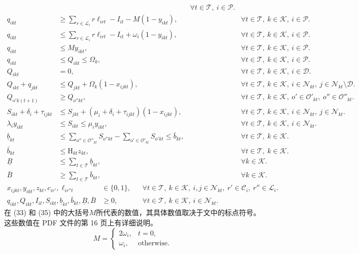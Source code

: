 \documentclass[10pt]{article}
\begin{document}
\begin{align}
&&\forall t\in\mathcal T,\ i\in\mathcal P.\tag{32}\\
 q_{ikt}&\geqslant\sum_{r\in\mathcal L_i}r\ell_{irt}-I_{it}-M(1-y_{ikt}),
&&\forall t\in\mathcal T,\ k\in\mathcal K,\ i\in\mathcal P.\tag{33}\\
 q_{ikt}&\leqslant\sum_{r\in\mathcal L_i}r\ell_{irt}-I_{it}+\omega_i(1-y_{ikt}),
&&\forall t\in\mathcal T,\ k\in\mathcal K,\ i\in\mathcal P.\tag{34}\\
 q_{ikt}&\leqslant My_{ikt},
&&\forall t\in\mathcal T,\ k\in\mathcal K,\ i\in\mathcal P.\tag{35}\\
 q_{ikt}&\leqslant Q_{ikt}\leqslant\Omega_k,
&&\forall t\in\mathcal T,\ k\in\mathcal K,\ i\in\mathcal P.\tag{36}\\
 Q_{ikt}&=0,
&&\forall t\in\mathcal T,\ k\in\mathcal K,\ i\in\mathcal D.\tag{37}\\
 Q_{ikt}+q_{jkt}&\leqslant Q_{jkt}+\Omega_k(1-x_{ijkt}),
&&\forall t\in\mathcal T,\ k\in\mathcal K,\ i\in\mathcal N_{kt},\ j\in\mathcal N_{kt}\setminus\mathcal D.\tag{38}\\
 Q_{o'k(t+1)}&\geqslant Q_{o''kt},
&&\forall t\in\mathcal T,\ k\in\mathcal K,\ o'\in\mathcal O'_{kt},\ o''\in\mathcal O''_{kt}.\tag{39}\\
 S_{ikt}+\delta_i+\tau_{ijkt}
&\leqslant S_{jkt}+(\mu_i+\delta_i+\tau_{ijkt})(1-x_{ijkt}),
&&\forall t\in\mathcal T,\ k\in\mathcal K,\ i\in\mathcal N_{kt},\ j\in\mathcal N_{kt}.\tag{40}\\
\lambda_i y_{ikt}&\leqslant S_{ikt}\leqslant\mu_i y_{ikt},
&&\forall t\in\mathcal T,\ k\in\mathcal K,\ i\in\mathcal N_{kt}.\tag{41}\\
\underline b_{kt}&\leqslant\sum_{o''\in\mathcal O''_{kt}}S_{o''kt}
-\sum_{o'\in\mathcal O'_{kt}}S_{o'kt}\leqslant\bar b_{kt},
&&\forall t\in\mathcal T,\ k\in\mathcal K.\tag{42}\\
\bar b_{kt}&\leqslant\mathrm H_{kt}z_{kt},
&&\forall t\in\mathcal T,\ k\in\mathcal K.\tag{43}\\
\underline B&\leqslant\sum_{t\in\mathcal T}\underline b_{kt},
&&\forall k\in\mathcal K.\tag{44}\\
\bar B&\geqslant\sum_{t\in\mathcal T}\bar b_{kt},
&&\forall k\in\mathcal K.\tag{45}
\end{align}
\begin{align}
 x_{ijkt},y_{ikt},z_{kt},c_{ir'},\ell_{ir''t}&\in\{0,1\},
&&\forall t\in\mathcal T,\ k\in\mathcal K,\ i,j\in\mathcal N_{kt},\ r'\in\mathcal C_i,\ r''\in\mathcal L_i.\tag{46}\\
 q_{ikt},Q_{ikt},I_{it},S_{ikt},\underline b_{kt},\bar b_{kt},\underline B,\bar B&\geqslant0,
&&\forall t\in\mathcal T,\ k\in\mathcal K,\ i\in\mathcal N_{kt}.\tag{47}
\end{align}
在 (33) 和 (35) 中的大括号$M$所代表的数值，其具体数值取决于文中的标点符号。这些数值在 PDF 文件的第 16 页上有详细说明。
\[
 M=\begin{cases}2\omega_i,&t=0,\\\omega_i,&\text{otherwise}.\end{cases}
\]
\end{document}
